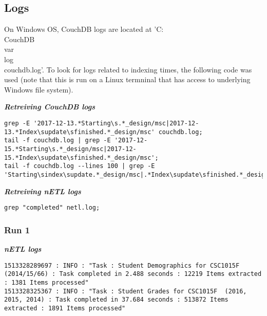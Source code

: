 \subsection{Logs}
On Windows OS, CouchDB logs are located at 'C:\\CouchDB\\var\\log\\couchdb.log'. To look for logs related to indexing times, the following code was used (note that this is run on a Linux termninal that has access to underlying Windows file system).

\textit{\textbf{Retreiving CouchDB logs}}
\begin{verbatim}
grep -E '2017-12-13.*Starting\s.*_design/msc|2017-12-13.*Index\supdate\sfinished.*_design/msc' couchdb.log;
tail -f couchdb.log | grep -E '2017-12-15.*Starting\s.*_design/msc|2017-12-15.*Index\supdate\sfinished.*_design/msc';
tail -f couchdb.log --lines 100 | grep -E 'Starting\sindex\supdate.*_design/msc|.*Index\supdate\sfinished.*_design/msc'
\end{verbatim}

\textit{\textbf{Retreiving nETL logs}}
\begin{verbatim}
grep "completed" netl.log;
\end{verbatim}


\subsubsection{Run 1}
\textit{\textbf{nETL logs}}
\begin{verbatim}
1513328289697 : INFO : "Task : Student Demographics for CSC1015F (2014/15/66) : Task completed in 2.488 seconds : 12219 Items extracted : 1381 Items processed"
1513328325367 : INFO : "Task : Student Grades for CSC1015F  (2016, 2015, 2014) : Task completed in 37.684 seconds : 513872 Items extracted : 1891 Items processed"
\end{verbatim}

